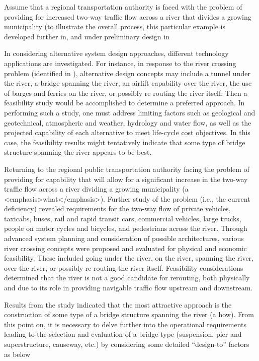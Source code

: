 Assume that a regional transportation authority is faced with the problem of providing for increased two-way traffic flow across a river that divides a growing municipality (to illustrate the overall process, this particular example is developed further in, and under preliminary design in 

In considering alternative system design approaches, different technology applications are investigated. For instance, in response to the river crossing problem (identified in ), alternative design concepts may include a tunnel under the river, a bridge spanning the river, an airlift capability over the river, the use of barges and ferries on the river, or possibly re-routing the river itself. Then a feasibility study would be accomplished to determine a preferred approach. In performing such a study, one must address limiting factors such as geological and geotechnical, atmospheric and weather, hydrology and water flow, as well as the projected capability of each alternative to meet life-cycle cost objectives. In this case, the feasibility results might tentatively indicate that some type of bridge structure spanning the river appears to be best.

Returning to the regional public transportation authority facing the problem of providing for capability that will allow for a significant increase in the two-way traffic flow across a river dividing a growing municipality (a <emphasis>what</emphasis>). Further study of the problem (i.e., the current deficiency) revealed requirements for the two-way flow of private vehicles, taxicabs, buses, rail and rapid transit cars, commercial vehicles, large trucks, people on motor cycles and bicycles, and pedestrians across the river. Through advanced system planning and consideration of possible architectures, various river crossing concepts were proposed and evaluated for physical and economic feasibility. These included going under the river, on the river, spanning the river, over the river, or possibly re-routing the river itself. Feasibility considerations determined that the river is not a good candidate for rerouting, both physically and due to its role in providing navigable traffic flow upstream and downstream.

Results from the study indicated that the most attractive approach is the construction of some type of a bridge structure spanning the river (a how). From this point on, it is necessary to delve further into the operational requirements leading to the selection and evaluation of a bridge type (suspension, pier and superstructure, causeway, etc.) by considering some detailed ``design-to'' factors as below

